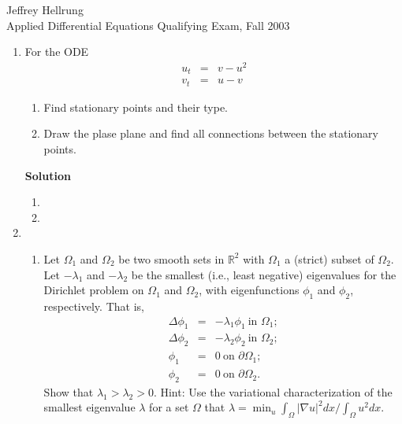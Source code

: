 \documentclass{article}
\begin{document}
\begin{flushright}
Jeffrey Hellrung \\
Applied Differential Equations Qualifying Exam, Fall 2003 \\
\end{flushright}


\begin{enumerate}

\item For the ODE
\begin{eqnarray*}
u_t & = & v - u^2 \\
v_t & = & u - v
\end{eqnarray*}

\begin{enumerate}
\item Find stationary points and their type.

\item Draw the plase plane and find all connections between the stationary points.

\end{enumerate}

{\bf Solution}

\begin{enumerate}
\item

\item

\end{enumerate}



\item

\begin{enumerate}
\item Let \(\Omega_1\) and \(\Omega_2\) be two smooth sets in \(\mathbb{R}^2\) with \(\Omega_1\) a (strict) subset of \(\Omega_2\).  Let \(-\lambda_1\) and \(-\lambda_2\) be the smallest (i.e., least negative) eigenvalues for the Dirichlet problem on \(\Omega_1\) and \(\Omega_2\), with eigenfunctions \(\phi_1\) and \(\phi_2\), respectively.  That is,
\begin{eqnarray*}
\Delta \phi_1 & = & -\lambda_1 \phi_1 \ \text{in \(\Omega_1\)}; \\
\Delta \phi_2 & = & -\lambda_2 \phi_2 \ \text{in \(\Omega_2\)}; \\
\phi_1 & = & 0 \ \text{on \(\partial\Omega_1\)}; \\
\phi_2 & = & 0 \ \text{on \(\partial\Omega_2\)}.
\end{eqnarray*}
Show that \(\lambda_1 > \lambda_2 > 0\).  Hint:  Use the variational characterization of the smallest eigenvalue \(\lambda\) for a set \(\Omega\) that \(\lambda = \min_u \int_{\Omega} |\nabla u|^2 dx / \int_{\Omega} u^2 dx\).


\end{enumerate}
\end{enumerate}
\end{document}
